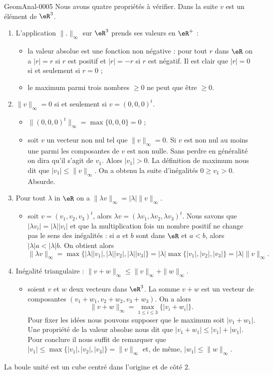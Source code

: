 \begin{corrige}{GeomAnal-0005}
Nous avons quatre propriétés à vérifier. Dans la suite $v$ est un élément de $\eR^3$.
\begin{enumerate}
\item L'application $\| . \|_{\infty}$ sur $\eR^3$ prends ses valeurs en $\eR^+$ :
  \begin{itemize}
  \item la valeur absolue est une fonction non négative : pour tout $r$ dans $\eR$ on a $|r|= r$ si $r$ est positif et $|r|= -r$ si $r$ est négatif. Il est clair que $|r|=0$ si et seulement si $r=0$ ;
  \item le maximum parmi trois nombres $\geq 0$ ne peut que être $\geq 0$.
  \end{itemize}
\item $\| v \|_{\infty}= 0$ si et seulement si $v=(0, 0, 0)^t$. 
  \begin{itemize}
  \item $\| (0,0,0)^t \|_{\infty}= \max\{0, 0 ,0\}= 0$ ;
  \item soit $v$ un vecteur non nul tel que $\| v \|_{\infty}= 0$. Si $v$ est non nul au moins une parmi les composantes de $v$ est non nulle. Sans perdre en généralité on dira qu'il s'agit de $v_1$. Alors $|v_1|> 0$. La définition de maximum nous dit que $|v_1|\leq \| v \|_{\infty}$. On a obtenu la suite d'inégalités $0\geq v_1>0$. Absurde.
  \end{itemize}
\item Pour tout $\lambda$ in $\eR$ on a  $\| \lambda v \|_{\infty}=|\lambda|\| v \|_{\infty}$. 
  \begin{itemize}
  \item soit $v=(v_1, v_2, v_3)^t$, alors $\lambda v= (\lambda v_1, \lambda v_2, \lambda v_3)^t$. Nous savons  que $|\lambda v_i|= |\lambda| |v_i|$ et que la multiplication fois un nombre positif ne change pas le sens des inégalités : si $a$ et $b$ sont dans $\eR$ et  $a<b$, alors $|\lambda| a < |\lambda| b$. On obtient alors 
\[
\| \lambda v \|_{\infty}=\max\{|\lambda| |v_1|,|\lambda| |v_2|, |\lambda| |v_3| \}= |\lambda| \max\{|v_1|, |v_2|, |v_3| \}=|\lambda|\| v \|_{\infty}.
\]   
  \end{itemize}
\item Inégalité triangulaire : $ \|v+w \|_{\infty}\leq\| v \|_{\infty}+\| w \|_{\infty}$.
  \begin{itemize}
  \item soient $v$ et $w$ deux vecteurs dans $\eR^3$. La somme $v+w$ est un vecteur de composantes $(v_1+w_1,v_2+w_2,v_3+w_3)$. On a alors 
\[
\|v+w \|_{\infty}=\max_{1\leq i\leq 3}\{|v_i+w_i|\}.
\]
Pour fixer les idées nous pouvons supposer que le maximum soit $|v_1+w_1|$. Une propriété de la valeur absolue nous dit que $|v_1+w_1|\leq|v_1|+|w_1|$. Pour conclure il nous suffit de remarquer que $|v_1|\leq \max\{|v_1|, |v_2|, |v_3| \}=\| v \|_{\infty}$ et, de même,  $|w_1|\leq \| w \|_{\infty}$.  
  \end{itemize}
\end{enumerate}

La boule unité est un cube centré dans l'origine et de côté 2.  

   
 

\end{corrige}
